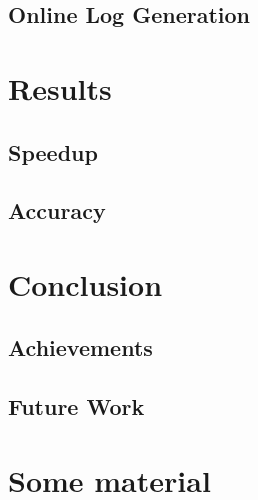 \documentclass[mscthesis]{usiinfthesis}
\begin{document}
\section{Online Log Generation}

\chapter{Results}
\section{Speedup}
\section{Accuracy}

\chapter{Conclusion}
\section{Achievements}
\section{Future Work}

\nocite{*}

\appendix %

\chapter{Some material}

\backmatter


%
%
%
%
%

%


\end{document}

